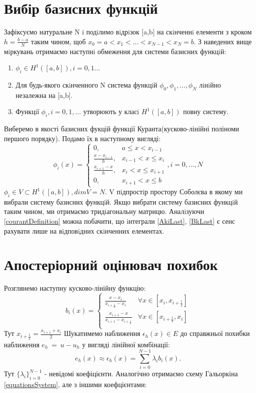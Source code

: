 \documentclass[a4paper]{article}
\numberwithin{equation}{section}
\begin{document}
\section{Вибір базисних функцій}
Зафіксуємо натуральне N i подiлимо вiдрiзок [a,b] на скiнченнi елементи з кроком $h=\frac{b-a}{N}$ таким чином, щоб $x_0 = a < x_1 < \ldots < x_{N-1} < x_N = b$. З наведених вище мiркувань отримаємо наступнi обмеження для системи базисних функцiй:
\begin{enumerate}
\item $\phi_i \in H^1([a, b]), i = 0, 1\ldots$
\item Для будь-якого скiнченного N система функцiй $\phi_0, \phi_1, \ldots, \phi_N$ лiнiйно незалежна на [a,b].
\item Функцiї $\phi_i, i=0,1,\ldots $ утворюють у класi $H^1([a, b])$ повну систему.
\end{enumerate}
Виберемо в якості базисних фукцій функції Куранта(кусково-лінійні поліноми першого порядку). Подамо їх в наступному вигляді:
\begin{equation}\label{courantDefinition}
\phi_i(x)=
\begin{cases} 
0, & a\leq x < x_{i-1}\\ \frac{x-x_{i-1}}{h}, & x_{i-1} < x \leq x_i\\ 
\frac{x_{i+1} - x}{h}, & x_i < x \leq x_{i+1} \\
0, & x_{i+1} < x \leq b
\end{cases}
,i=0,\ldots,N
\end{equation}
$\phi_i \in V \subset H^1([a, b]), dimV = N$. V пiдпростiр простору Соболєва в якому ми вибрали систему базисних функцiй. Якщо вибрати систему базисних функцiй таким чином, ми отримаємо тридiа\-гональну матрицю. Аналiзуючи \ref{courantDefinition} можна побачити, що iнтеграли \ref{AkiLast}, \ref{BkLast} є сенс рахувати лише на вiдповiдних скiнченних елементах.

\section{Апостеріорний оцінювач похибок}
Розглянемо наступну кусково-лінійну функцію:
\begin{equation}\label{bubbleFunctions}
b_i(x)=\begin{cases}
\frac{ x - x_i } { x_{i + \frac{1}{2} } - x_i } & \forall x \in [x_i, x_{i + \frac{1}{2}}] \\
\frac{ x_{i + 1} - x} { x_{ i + 1 } - x_{ i + \frac{1}{2} } } & \forall x \in [ x_{ i + \frac{1}{2} }, x_i] \\
\end{cases}
\end{equation}
Тут $x_{ i + \frac{1}{2} } = \frac{x_{ i + 1 } + x_i}{2}$ Шукатимемо наближення $\epsilon_h(x) \in E$ до справжньої похибки наближення $e_h~=~u-u_h$ у вигляді лінійної комбінації:
\begin{equation}
e_h(x)\approx\epsilon_h(x)=\sum_{i=0}^{N-1}\lambda_ib_i(x).
\end{equation}
Тут $\{\lambda_i\}_{i=0}^{N-1}$ - невідомі коефіцієнти. Аналогічно отримаємо схему Гальоркіна \ref{equationsSystem}, але з іншими коефцієнтами:
\end{document}
